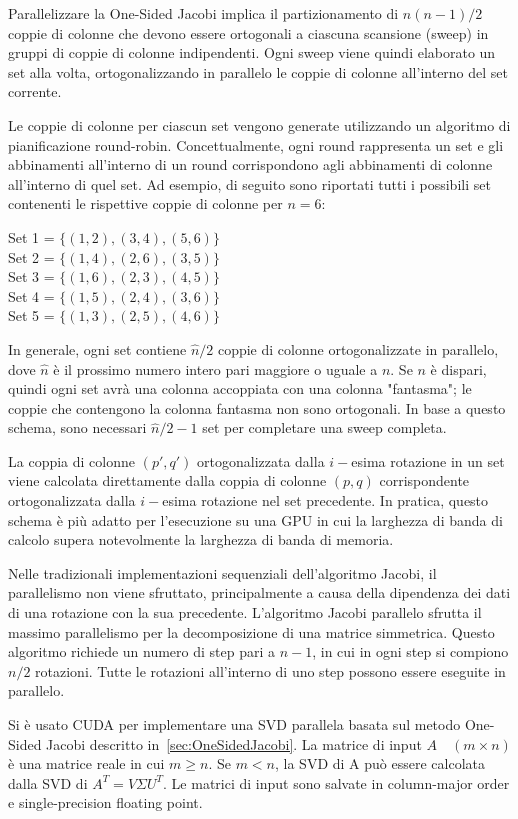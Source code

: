 Parallelizzare la One-Sided Jacobi implica il partizionamento di $n(n-1)/2$ coppie di colonne che devono essere ortogonali a ciascuna scansione (sweep) in gruppi di coppie di colonne indipendenti. Ogni sweep viene quindi elaborato un set alla volta, ortogonalizzando in parallelo le coppie di colonne all'interno del set corrente.

Le coppie di colonne per ciascun set vengono generate utilizzando un algoritmo di pianificazione round-robin. Concettualmente, ogni round rappresenta un set e gli abbinamenti all'interno di un round corrispondono agli abbinamenti di colonne all'interno di quel set. Ad esempio, di seguito sono riportati tutti i possibili set contenenti le rispettive coppie di colonne per $n = 6$:
\begin{center}
	Set 1 = $\{(1,2),(3,4),(5,6)\}$\\
	Set 2 = $\{(1,4),(2,6),(3,5)\}$\\
	Set 3 = $\{(1,6),(2,3),(4,5)\}$\\
	Set 4 = $\{(1,5),(2,4),(3,6)\}$\\
	Set 5 = $\{(1,3),(2,5),(4,6)\}$\\
\end{center}
In generale, ogni set contiene $\hat{n}/2$ coppie di colonne ortogonalizzate in parallelo, dove $\hat{n}$ è il prossimo numero intero pari maggiore o uguale a $n$. Se $n$ è dispari, quindi ogni set avrà una colonna accoppiata con una colonna "fantasma"; le coppie che contengono la colonna fantasma non sono ortogonali. In base a questo schema, sono necessari $\hat{n}/2 - 1$ set per completare una sweep completa.

La coppia di colonne $(p', q')$ ortogonalizzata dalla $i-$esima rotazione in un set viene calcolata direttamente dalla coppia di colonne $(p, q)$ corrispondente ortogonalizzata dalla $i-$esima rotazione nel set precedente. In pratica, questo schema è più adatto per l'esecuzione su una GPU in cui la larghezza di banda di calcolo supera notevolmente la larghezza di banda di memoria. \cite{Romer:SVD}

Nelle tradizionali implementazioni sequenziali dell'algoritmo Jacobi, il parallelismo non viene sfruttato, principalmente a causa della dipendenza dei dati di una rotazione con la sua precedente. L'algoritmo Jacobi parallelo sfrutta il massimo parallelismo per la decomposizione di una matrice simmetrica. Questo algoritmo richiede un numero di step pari a $n - 1$, in cui in ogni step si compiono $n/2$ rotazioni. Tutte le rotazioni all'interno di uno step possono essere eseguite in parallelo. \cite{Acosta:SVD}

Si è usato CUDA per implementare una SVD parallela basata sul metodo One-Sided Jacobi descritto in~\ref{sec:OneSidedJacobi}. La matrice di input $A \quad (m \times n)$ è una matrice reale in cui $m \geq n$. Se $m < n$, la SVD di A può essere calcolata dalla SVD di $A^T = V \Sigma U^T$. Le matrici di input sono salvate in column-major order e single-precision floating point. \cite{Romer:SVD}